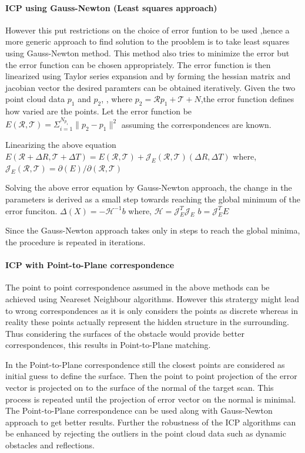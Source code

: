 \paragraph{ICP using Gauss-Newton (Least squares approach)}
However this put restrictions on the choice of error funtion to be used ,hence a more generic approach to find solution to the prooblem is
to take least squares using Gauss-Newton method. This method also tries to minimize the error but the error function can be chosen appropriately. The error function is then linearized
using Taylor series expansion and by forming the hessian matrix and jacobian vector the desired paramters can be obtained iteratively.
Given the two point cloud data $p_1$ and $p_2$, , where $p_2 = \mathcal{R}p_1 + \mathcal{T} + N$,the error function defines how varied are the points.
Let the error function be 
    $E(\mathcal{R}, \mathcal{T}) = \Sigma_{i=1}^{N_{p_1}}\lVert p_2 -  p_1 \rVert^2 $
assuming the correspondences are known.
\par
Linearizing the above equation
    $E(\mathcal{R}+\Delta{R} , \mathcal{T}+ \Delta{T}) = E(\mathcal{R}, \mathcal{T}) + \mathcal{J}_E(\mathcal{R}, \mathcal{T})(\Delta{R} ,\Delta{T})$
    where,
    $\mathcal{J}_E(\mathcal{R}, \mathcal{T}) = \partial (E) / \partial (\mathcal{R}, \mathcal{T})$

Solving the above error equation by Gauss-Newton approach, the change in the parameters is derived as a small step towards reaching the global minimum of the error funciton.
    $\Delta(X) = -\mathcal{H}^{-1} b$
    where,
    $\mathcal{H} = \mathcal{J}_E^{T}\mathcal{J}_E$
    $b = \mathcal{J}_E^{T} E$

Since the Gauss-Newton approach takes only in steps to reach the global minima, the procedure is repeated in iterations.
\par
\paragraph{ICP with Point-to-Plane correspondence}
The point to point correspondence assumed in the above methods can be achieved using Neareset Neighbour algorithms. However this stratergy might lead to wrong correspondences as it is only considers the points as discrete
whereas in reality these points actually represent the hidden structure in the surrounding. Thus considering the surfaces of the obstacle would provide better correspondences, this results in Point-to-Plane matching.
\par
In the Point-to-Plane correspondence still the closest points are considered as initial guess to define the surface. Then the point to point projection of the error vector is projected on to the surface of the normal of the 
target scan. This process is repeated until the projection of error vector on the normal is minimal.
The Point-to-Plane correspondence can be used along with Gauss-Newton approach to get better results.
Further the robustness of the ICP algorithms can be enhanced by rejecting the outliers in the point cloud data such as dynamic obstacles and reflections.

